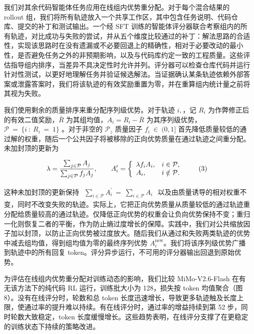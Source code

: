 \documentclass[
  10
]{article}
\begin{document}
我们对其余代码智能体任务应用在线组内优势重分配。对于每个混合结果的 rollout 组，我们将所有轨迹放入一个共享工作区，其中包含任务说明、代码仓库、提交的补丁和测试输出。一个经 SFT 训练的智能体评分器联合考察组内的所有轨迹，对比成功与失败的尝试，并从五个维度比较通过的补丁：解法思路的合适性，实现该思路时在没有遗漏或不必要回退上的精确性，相对于必要改动的最小性，是否避免任务之外的非预期影响，以及与代码库约定一致的工程质量。这些评估指导组内排序，当差异不具决定性时允许并列。评分器可以检查仓库代码并运行针对性测试，以更好地理解任务并验证候选解法。当证据确认某条轨迹依赖外部答案或泄露答案时，我们将该轨迹的有效奖励重置为零，并在重算组内统计量之前将其视为失败。

我们使用剩余的质量排序来重分配序列级优势。对于轨迹 \(i ,\)，记 \(R _ { i }\) 为作弊修正后的有效二值奖励，$\bar{R}$ 为其组均值，\(A _ { i } = R _ { i } - \bar { R }\) 为其序列级优势，\(\mathcal { P } \ = \ \{ i \ : \ R _ { i } \ = \ 1 \}\) 。对于非空的 \(\mathcal { P } _ { z }\) 质量因子 \(f _ { i } ~ \in ~ ( 0 , 1 ]\) 首先降低质量较低的通过解的权重，随后一个公共因子将被移除的正向优势质量在通过轨迹之间重分配。未加封顶的更新为

\[
\lambda = \frac { \sum _ { j \in \mathcal { P } } A _ { j } } { \sum _ { j \in \mathcal { P } } f _ { j } A _ { j } } , \qquad A _ { i } ^ { \prime } = \left\{ \begin{array} { l l } { \lambda f _ { i } A _ { i } , } & { i \in \mathcal { P } , } \\ { A _ { i } , } & { i \notin \mathcal { P } . } \end{array} \right.\tag{3}
\]

这种未加封顶的更新保持
\(\begin{array} { r } { \sum _ { i \in \mathcal { P } } A _ { i } ^ { \prime } \ = \ \sum _ { i \in \mathcal { P } } A _ { i } } \end{array}\)
以及由质量诱导的相对权重不变，同时不改变失败的轨迹。实际上，它把正向优势质量从质量较低的通过轨迹重分配给质量较高的通过轨迹。仅降低正向优势的权重会让负向优势保持不变；重归一化则恢复二者的平衡，作为防止熵过度增长的保障。实践中，我们对公共缩放因子加以封顶，以防止正向优势被过度放大。随后我们从通过和失败两类轨迹的优势中减去组均值，得到组均值为零的最终序列优势 \(A _ { i } ^ { \mathrm { n e w } }\)。我们将该序列级优势广播到轨迹中的所有回复 token。评分异步运行，不可用的评分器输出回退到原始优势。

为评估在线组内优势重分配对训练动态的影响，我们比较 MiMo-V2.6-Flash 在有无该方法下的纯代码 RL 运行，训练批大小为 128，损失按 token 均值聚合（图 8）。没有在线评分时，轮数和总 token 长度迅速增长，导致更多轨迹触及长度上限，使通过率的提升难以持续。有在线评分时，通过率的增益持续到第 52 步，同时轮数大致稳定，token 长度缓慢增长。这些趋势表明，在线评分支撑了在更稳定的训练状态下持续的策略改进。
\end{document}
